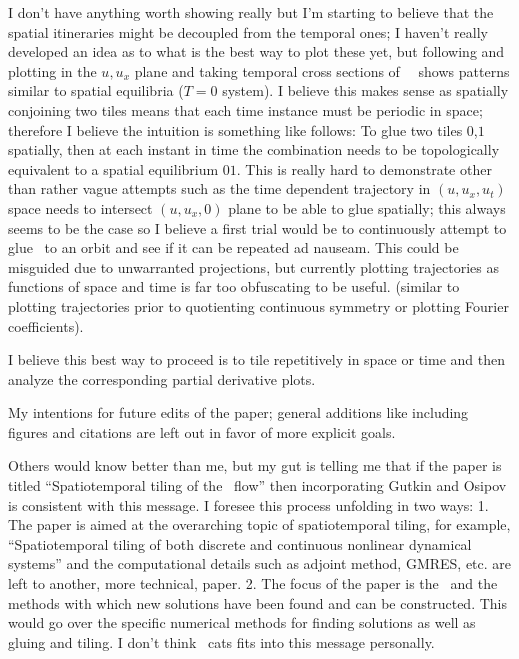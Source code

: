 \begin{itemize}
I don't have anything worth showing really but I'm starting to believe that the spatial
itineraries might be decoupled from the temporal ones; I haven't really developed
an idea as to what is the best way to plot these yet, but following 
and plotting in the $u,u_x$ plane and taking temporal cross sections of \spt\ \twots\
shows patterns similar to spatial equilibria ($T=0$ system). I believe this makes
sense as spatially conjoining two tiles means that each time instance must be periodic in space;
therefore I believe the intuition is something like follows: To glue two tiles $0$,$1$ spatially,
then at each instant in time the combination needs to be topologically equivalent to a spatial
equilibrium $01$. This is really hard to demonstrate other than rather vague attempts such
as the time dependent trajectory in $(u,u_x,u_t)$ space needs to intersect $(u,u_x,0)$ plane
to be able to glue spatially; this always seems to be the case so I believe a first
trial would be to continuously attempt to glue \eqva\ to an orbit and see if it can
be repeated ad nauseam. This could be misguided due to unwarranted projections, but
currently plotting trajectories as functions of space and time is far too obfuscating
to be useful. (similar to plotting trajectories prior to quotienting continuous symmetry
or plotting Fourier coefficients).

I believe this best way to proceed is to tile repetitively in space or time and then analyze the
corresponding partial derivative plots.

My intentions for future edits of the paper; general
additions like including figures and citations are left out
in favor of more explicit goals.

Others would know better than me, but my gut is telling me that
if the paper is titled ``Spatiotemporal tiling of the \KS\ flow''
then incorporating Gutkin and Osipov is consistent with this message.
I foresee this process unfolding in two ways:
1. The paper is aimed at the overarching topic of spatiotemporal tiling,
for example, ``Spatiotemporal tiling of both discrete and continuous nonlinear
dynamical systems'' and the computational details such as adjoint method, GMRES,
etc. are left to another, more technical, paper.
2. The focus of the paper is the \KSe\ and the methods with which new solutions
have been found and can be constructed. This would go over the specific numerical
methods for finding solutions as well as gluing and tiling. I don't think \spt\
cats fits into this message personally.


\end{itemize}
